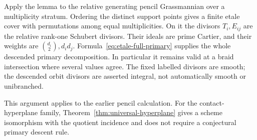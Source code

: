 Apply the lemma to the relative generating pencil Grassmannian over
a multiplicity stratum. Ordering the distinct support points gives
a finite etale cover with permutations among equal multiplicities.
On it the divisors $T_i,E_{ij}$ are the relative rank-one Schubert
divisors. Their ideals are prime Cartier, and their weights are
$\binom{d_i}2,d_id_j$. Formula~\eqref{eq:etale-full-primary} supplies
the whole descended primary decomposition. In particular it remains
valid at a braid intersection where several values agree. The
fixed labelled divisors are smooth; the descended orbit divisors
are asserted integral, not automatically smooth or unibranched.

This argument applies to the earlier pencil calculation. For the
contact-hyperplane family, Theorem~\ref{thm:universal-hyperplane}
gives a scheme isomorphism with the quotient incidence and does not
require a conjectural primary descent rule.
